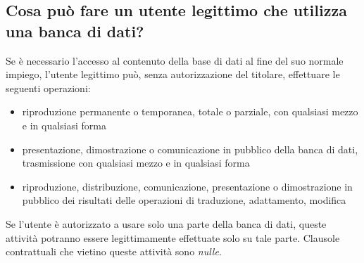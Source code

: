 \subsection{Cosa può fare un utente legittimo che utilizza una banca di dati?}
Se è necessario l'accesso al contenuto della base di dati al fine del suo normale impiego, l'utente legittimo
può, senza autorizzazione del titolare, effettuare le seguenti operazioni:
\begin{itemize}
    \item riproduzione permanente o temporanea, totale o parziale, con qualsiasi mezzo e in qualsiasi forma
    \item presentazione, dimostrazione o comunicazione in pubblico della banca di dati, trasmissione con qualsiasi mezzo
    e in qualsiasi forma
    \item riproduzione, distribuzione, comunicazione, presentazione o dimostrazione in pubblico dei risultati
    delle operazioni di traduzione, adattamento, modifica
\end{itemize}
Se l'utente è autorizzato a usare solo una parte della banca di dati, queste attività potranno essere legittimamente effettuate
solo su tale parte. \newline
Clausole contrattuali che vietino queste attività sono \emph{nulle}.

